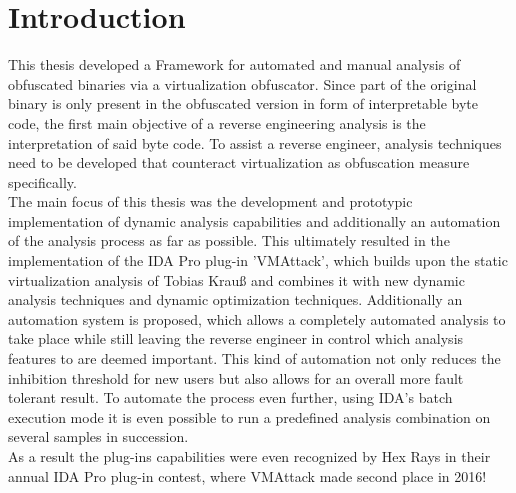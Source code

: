 \documentclass[10pt,twoside,a4paper,bibliography=totoc]{scrbook}
\newcommand{\echoOther}[1]{Tobias Krau{\ss}}
\begin{document}
\chapter{Introduction}
\label{sec1:intro}
This thesis developed a Framework for automated and manual analysis of obfuscated binaries via a virtualization obfuscator. 
Since part of the original binary is only present in the obfuscated version in form of interpretable byte code, the first main objective of a reverse engineering analysis is the interpretation of said byte code. 
To assist a reverse engineer, analysis techniques need to be developed that counteract virtualization as obfuscation measure specifically.\\ 
The main focus of this thesis was the development and prototypic implementation of dynamic analysis capabilities and additionally an automation of the analysis process as far as possible. 
This ultimately resulted in the implementation of the IDA Pro plug-in 'VMAttack', which builds upon the static virtualization analysis of \echoOther{} and combines it with new dynamic analysis techniques and dynamic optimization techniques. 
Additionally an automation system is proposed, which allows a completely automated analysis to take place while still leaving the reverse engineer in control which analysis features to are deemed important. This kind of automation not only reduces the inhibition threshold for new users but also allows for an overall more fault tolerant result. 
To automate the process even further, using IDA's batch execution mode it is even possible to run a predefined analysis combination on several samples in succession. \\
As a result the plug-ins capabilities were even recognized by Hex Rays in their annual IDA  Pro plug-in contest, where VMAttack made second place in 2016!\\
\end{document}
